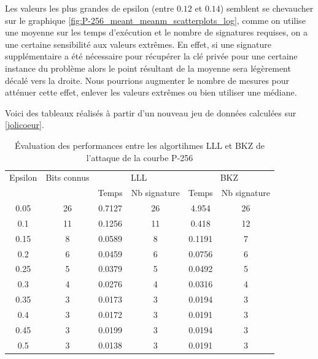 \documentclass{backend}
\begin{document}
Les valeurs les plus grandes de epsilon (entre $0.12$ et $0.14$) semblent se chevaucher sur le graphique \ref{fig:P-256_meant_meanm_scatterplots_log}, comme on utilise une moyenne sur les temps d'exécution et le nombre de signatures requises, on a une certaine sensibilité aux valeurs extrêmes. En effet, si une signature supplémentaire a été nécessaire pour récupérer la clé privée pour une certaine instance du problème alors le point résultant de la moyenne sera légèrement décalé vers la droite.\smallbreak
Nous pourrions augmenter le nombre de mesures pour atténuer cette effet, enlever les valeurs extrêmes ou bien utiliser une médiane.

Voici des tableaux réalisés à partir d'un nouveau jeu de données calculées sur \ref{jolicoeur}. %


\begin{center}
    \begin{table}[H]
        \centering
        \caption{Évaluation des performances entre les algortihmes LLL et BKZ de l'attaque de la courbe P-256}
        \label{tab:p-256_LLL_BKZ}
        
        \begin{tabular}{|c|c|cc|cc|}
            \toprule
            Epsilon & Bits connus & \multicolumn{2}{|c|}{LLL} & \multicolumn{2}{|c|}{BKZ} \\
            \cmidrule{3-6}
            & & Temps & Nb signature & Temps & Nb signature  \\
            \midrule
             0.05 &26 & 0.7127 & 26 & 4.954 & 26\\
             0.1  &11 & 0.1256 & 11 & 0.418 & 12\\
             0.15 & 8 & 0.0589 & 8 & 0.1191 & 7 \\
             0.2  & 6 & 0.0459 & 6 & 0.0756 & 6 \\
             0.25 & 5 & 0.0379 & 5 & 0.0492 & 5 \\
             0.3  & 4 & 0.0276 & 4 & 0.0316 & 4 \\
             0.35 & 3 & 0.0173 & 3 & 0.0194 & 3 \\
             0.4  & 3 & 0.0172 & 3 & 0.0191 & 3 \\
             0.45 & 3 & 0.0199 & 3 & 0.0194 & 3 \\
             0.5  & 3 & 0.0138 & 3 & 0.0191 & 3 \\
               
            \bottomrule
        \end{tabular}
    \end{table}
\end{center}
\end{document}
